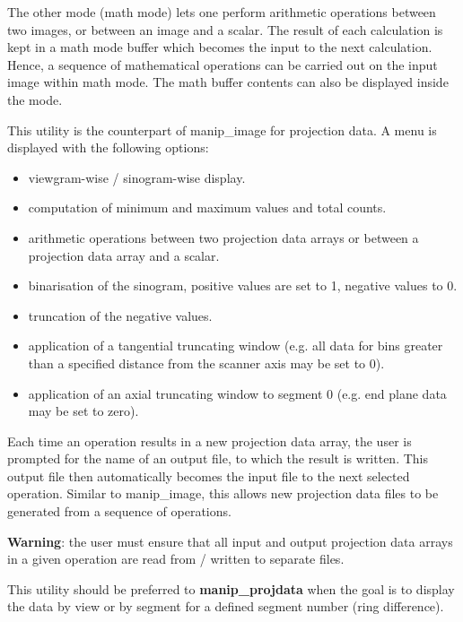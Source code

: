 \documentclass{article}
\begin{document}
The other mode (math mode) lets one perform arithmetic operations 
between two images, or between an image and a scalar. The result 
of each calculation is kept in a math mode buffer which becomes 
the input to the next calculation. Hence, a sequence of mathematical 
operations can be carried out on the input image within math 
mode. The math buffer contents can also be displayed inside the 
mode.

{ 
}

This utility is the counterpart of manip\_image for projection 
data. A menu is displayed with the following options:

\begin{itemize}
\item viewgram-wise / sinogram-wise display.
\item computation of minimum and maximum values and total counts.
\item arithmetic operations between two projection data arrays or 
between a projection data array and a scalar.
\item binarisation of the sinogram, positive values are set to 1, 
negative values to 0.
\item truncation of the negative values.
\item application of a tangential truncating window (e.g. all data 
for bins greater than a specified distance from the scanner axis 
may be set to 0).
\item application of an axial truncating window to segment 0 (e.g. 
end plane data may be set to zero).
\end{itemize}
Each time an operation results in a new projection data array, 
the user is prompted for the name of an output file, to which 
the result is written. This output file then automatically becomes 
the input file to the next selected operation. Similar to manip\_image, 
this allows new projection data files to be generated from a 
sequence of operations.


\textbf{Warning}: the user must ensure that all input and output projection 
data arrays in a given operation are read from / written to separate 
files.

{ 
}

This utility should be preferred to \textbf{manip\_projdata} when the 
goal is to display the data by view or by segment for a defined 
segment number (ring difference).

{ 
}
\end{document}
